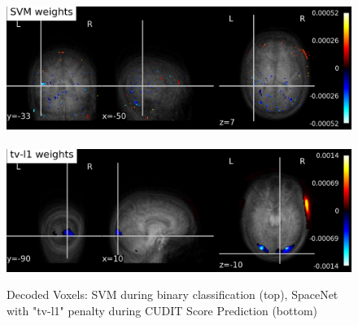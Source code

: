 \documentclass[conference]{IEEEtran}
\begin{document}
\begin{figure}[htbp]
\includegraphics[scale=0.45]{svm_decoding.png} \\ \\
\includegraphics[scale=0.45]{tv-l1BESTBEST.png}
\caption{Decoded Voxels: SVM during binary classification (top), SpaceNet with "tv-l1" penalty during CUDIT Score Prediction (bottom)}
\label{Picture1}
\end{figure}
\end{document}
